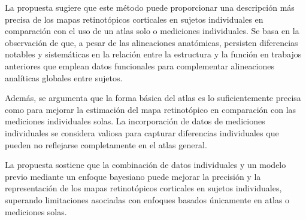 La propuesta sugiere que este método puede proporcionar una descripción más precisa de los mapas retinotópicos corticales en sujetos individuales en comparación con el uso de un atlas solo o mediciones individuales. Se basa en la observación de que, a pesar de las alineaciones anatómicas, persisten diferencias notables y sistemáticas en la relación entre la estructura y la función en trabajos anteriores que emplean datos funcionales para complementar alineaciones analíticas globales entre sujetos.

Además, se argumenta que la forma básica del atlas es lo suficientemente precisa como para mejorar la estimación del mapa retinotópico en comparación con las mediciones individuales solas. La incorporación de datos de mediciones individuales se considera valiosa para capturar diferencias individuales que pueden no reflejarse completamente en el atlas general.

La propuesta sostiene que la combinación de datos individuales y un modelo previo mediante un enfoque bayesiano puede mejorar la precisión y la representación de los mapas retinotópicos corticales en sujetos individuales, superando limitaciones asociadas con enfoques basados únicamente en atlas o mediciones solas. 


